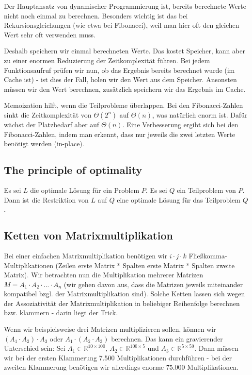 \documentclass[12pt]{article}
\begin{document}
Der Hauptansatz von dynamischer Programmierung ist, bereits berechnete Werte nicht noch einmal zu berechnen. Besonders wichtig ist das bei Rekursionsgleichungen (wie etwa bei Fibonacci), weil man hier oft den gleichen Wert sehr oft verwenden muss.

Deshalb speichern wir einmal berechneten Werte. Das kostet Speicher, kann aber zu einer enormen Reduzierung der Zeitkomplexität führen. Bei jedem Funktionsaufruf prüfen wir nun, ob das Ergebnis bereits berechnet wurde (im Cache ist) - ist dies der Fall, holen wir den Wert aus dem Speicher. Ansonsten müssen wir den Wert berechnen, zusätzlich speichern wir das Ergebnis im Cache.

Memoization hilft, wenn die Teilprobleme überlappen. Bei den Fibonacci-Zahlen sinkt die Zeitkomplexität von $\Theta(2^n)$ auf $\Theta(n)$, was natürlich enorm ist. Dafür wächst der Platzbedarf aber auf $\Theta(n)$. Eine Verbesserung ergibt sich bei den Fibonacci-Zahlen, indem man erkennt, dass nur jeweils die zwei letzten Werte benötigt werden (in-place).

\subsection{The principle of optimality}

Es sei $L$ die optimale Lösung für ein Problem $P$. Es sei $Q$ ein Teilproblem von $P$. Dann ist die Restriktion von $L$ auf $Q$ eine optimale Lösung für das Teilproblem $Q$.

\subsection{Ketten von Matrixmultiplikation}

Bei einer einfachen Matrixmultiplikation benötigen wir $i \cdot j \cdot k$ Fließkomma-Multiplikationen (Zeilen erste Matrix * Spalten erste Matrix * Spalten zweite Matrix). Wir betrachten nun die Multiplikation mehrerer Matrizen $M = A_1 \cdot A_2 \cdot ... \cdot A_n$ (wir gehen davon aus, dass die Matrizen jeweils miteinander kompatibel bzgl. der Matrixmultiplikation sind). Solche Ketten lassen sich wegen der Assoziativität der Matrixmultiplikation in beliebiger Reihenfolge berechnen bzw. klammern - darin liegt der Trick.

Wenn wir beispielsweise drei Matrizen multiplizieren sollen, können wir $(A_1 \cdot A_2) \cdot A_3$ oder $A_1 \cdot (A_2 \cdot A_3)$ berechnen. Das kann ein gravierender Unterschied sein: Sei $A_1 \in \mathbb{R}^{10 \times 100}$, $A_2 \in \mathbb{R}^{100 \times 5}$ und $A_3 \in \mathbb{R}^{5 \times 50}$. Dann müssen wir bei der ersten Klammerung 7.500 Multiplikationen durchführen - bei der zweiten Klammerung benötigen wir allerdings enorme 75.000 Multiplikationen.
\end{document}
